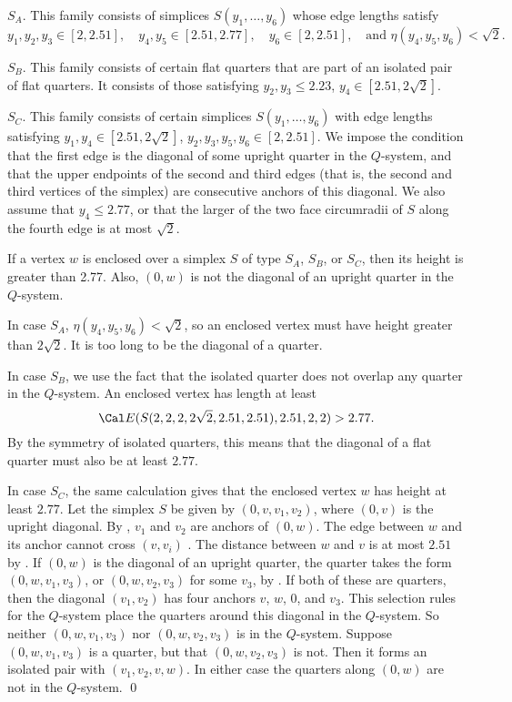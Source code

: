 $S_A$.  This family consists of simplices $S(y_1,\ldots,y_6)$ whose
	edge lengths satisfy 
	$$y_1,y_2,y_3\in[2,2.51],\quad y_4,y_5\in[2.51,2.77], 
	\quad y_6\in[2,2.51],\quad \text{and }\eta(y_4,y_5,y_6)<\sqrt{2}.$$

$S_B$.  This family consists of certain flat quarters that are part of
	an isolated pair of flat quarters.
	It consists of those satisfying $y_2,y_3\le 2.23$,
	$y_4\in[2.51,2\sqrt{2}]$.

$S_C$.  This family consists of certain
	simplices $S(y_1,\ldots,y_6)$ with
	edge lengths satisfying 
	$y_1,y_4\in[2.51,2\sqrt{2}]$, $y_2,y_3,y_5,y_6\in[2,2.51]$.
	We impose the condition that the first edge is the 
	diagonal of some upright quarter in the $Q$-system, 
	and that the upper endpoints
	of the second and third edges (that is, the second and third
	vertices of the simplex) are consecutive anchors of this
	diagonal.  
	We also assume that $y_4\le 2.77$, or that the larger 
	of the two face circumradii 
	of $S$ along the fourth edge is
	at most $\sqrt{2}$.

  If a vertex $w$ is enclosed over a simplex $S$ of type
$S_A$, $S_B$, or $S_C$, then its height is greater than 2.77.  Also,
$(0,w)$ is not the diagonal of an upright quarter in the $Q$-system.
\endproclaim

In case $S_A$, $\eta(y_4,y_5,y_6)<\sqrt{2}$, so an enclosed vertex
must have height greater than $2\sqrt{2}$.  It is too long to be the
diagonal of a quarter.

In case $S_B$, we use the fact that the isolated quarter does not
overlap any quarter in the $Q$-system.  An enclosed vertex has length
at least
	$$\Cal E(S(2,2,2,2\sqrt{2},2.51,2.51),2.51,2,2)>2.77.$$
By the symmetry of isolated quarters, this means that the diagonal of
a flat quarter must also be at least $2.77$.

In case $S_C$, the same calculation gives that the enclosed vertex $w$
has height
at least $2.77$.  Let the simplex $S$ be given by
$(0,v,v_1,v_2)$, where $(0,v)$ is the upright diagonal.
By \cite{F.1.5}, $v_1$ and $v_2$
are anchors of $(0,w)$.  The edge
between $w$ and its anchor cannot
cross $(v,v_i)$ \cite{F.1.3}.  The distance between $w$ and
$v$ is at most $2.51$ by \cite{F.1.9}.   If $(0,w)$ is the diagonal
of an upright quarter, the quarter takes the form
$(0,w,v_1,v_3)$, or $(0,w,v_2,v_3)$ for some $v_3$, 
by \cite{F.1.8}.  If both
of these are quarters, then the diagonal $(v_1,v_2)$ has four anchors
$v$, $w$, $0$, and $v_3$.  This selection rules for the $Q$-system
place the quarters around this diagonal in the $Q$-system.  
So neither $(0,w,v_1,v_3)$ nor $(0,w,v_2,v_3)$ is in the
$Q$-system.  
Suppose $(0,w,v_1,v_3)$ is a quarter, but that
$(0,w,v_2,v_3)$ is not.  Then
it forms an isolated pair with $(v_1,v_2,v,w)$.  In either case
the quarters along $(0,w)$ are not in the $Q$-system.
\qed
\enddemo

